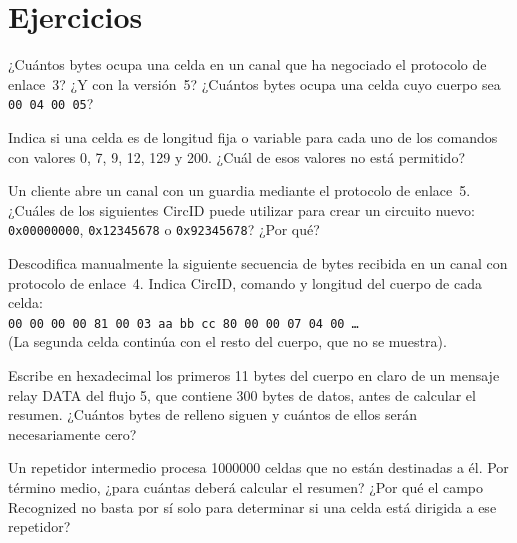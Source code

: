 \section*{Ejercicios}

\begin{esercizio}[1]\label{es:08-lunghezze}
¿Cuántos bytes ocupa una celda  en un canal que ha negociado el protocolo de enlace~3? ¿Y con la versión~5? ¿Cuántos bytes ocupa una celda  cuyo cuerpo sea \texttt{00 04 00 05}?
\end{esercizio}

\begin{esercizio}[1]\label{es:08-formato}
Indica si una celda es de longitud fija o variable para cada uno de los comandos con valores 0, 7, 9, 12, 129 y 200. ¿Cuál de esos valores no está permitido?
\end{esercizio}

\begin{esercizio}[1]\label{es:08-circid}
Un cliente abre un canal con un guardia mediante el protocolo de enlace~5. ¿Cuáles de los siguientes CircID puede utilizar para crear un circuito nuevo: \texttt{0x00000000}, \texttt{0x12345678} o \texttt{0x92345678}? ¿Por qué?
\end{esercizio}

\begin{esercizio}[2]\label{es:08-hex}
Descodifica manualmente la siguiente secuencia de bytes recibida en un canal con protocolo de enlace~4. Indica CircID, comando y longitud del cuerpo de cada celda:\\
\texttt{00 00 00 00 81 00 03 aa bb cc 80 00 00 07 04 00 \ldots}\\
(La segunda celda continúa con el resto del cuerpo, que no se muestra).
\end{esercizio}

\begin{esercizio}[2]\label{es:08-relay}
Escribe en hexadecimal los primeros 11 bytes del cuerpo en claro de un mensaje relay DATA del flujo 5, que contiene 300 bytes de datos, antes de calcular el resumen. ¿Cuántos bytes de relleno siguen y cuántos de ellos serán necesariamente cero?
\end{esercizio}

\begin{esercizio}[2]\label{es:08-recognized}
Un repetidor intermedio procesa \num{1000000} celdas que no están destinadas a él. Por término medio, ¿para cuántas deberá calcular el resumen? ¿Por qué el campo Recognized no basta por sí solo para determinar si una celda está dirigida a ese repetidor?
\end{esercizio}

